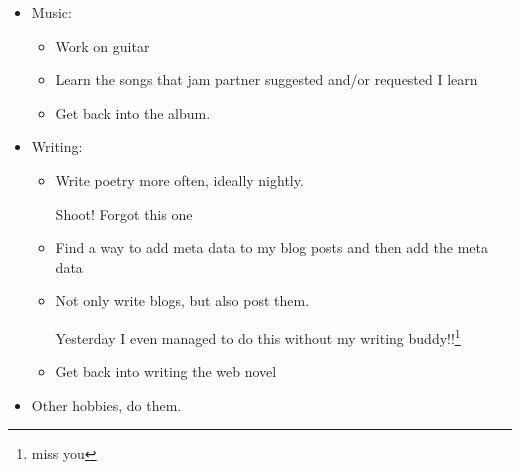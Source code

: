 \documentclass[12pt]{article}[titlepage]
\newcommand{\1}{\={a}}
\newcommand{\2}{\={e}}
\newcommand{\3}{\={\i}}
\newcommand{\4}{\=o}
\newcommand{\5}{\=u}
\newcommand{\6}{\={A}}
\renewcommand{\,}{\textsuperscript{,}}
\begin{document}
\begin{itemize}
\begin{itemize}
\item Music:   
\begin{itemize}   
\item Work on guitar  
\item Learn the songs that jam partner suggested and/or requested I learn  
\item Get back into the album.  
\end{itemize}   
\item Writing:  
\begin{itemize}   
\item Write poetry more often, ideally nightly.  
  
Shoot! Forgot this one  
\item Find a way to add meta data to my blog posts and then add the meta data  
\item Not only write blogs, but also post them.

Yesterday I even managed to do this without my writing buddy!!\footnote{miss you}  
\item Get back into writing the web novel  
\end{itemize}   
\item Other hobbies, do them.  
\end{itemize}
\end{itemize}
\end{document}
